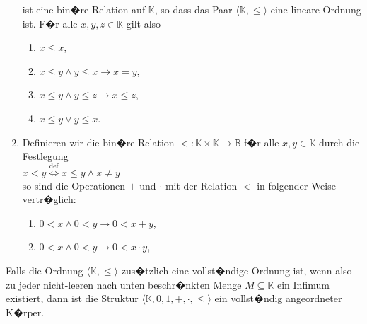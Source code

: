 \begin{Definition}
\begin{enumerate}
        ist eine bin�re Relation auf $\mathbb{K}$, so dass das Paar $\langle \mathbb{K}, \leq
       \rangle$ eine lineare Ordnung ist.  F�r alle
        $x,y,z \in \mathbb{K}$ gilt also
        \begin{enumerate}
        \item $x \leq x$,
        \item $x \leq y \wedge y \leq x \rightarrow x = y$,
        \item $x \leq y \wedge y \leq z \rightarrow x \leq z$,
        \item $x \leq y \vee y \leq x$.
        \end{enumerate}
  \item Definieren wir die bin�re Relation $<: \mathbb{K} \times \mathbb{K} \rightarrow \mathbb{B}$
        f�r alle $x,y \in \mathbb{K}$ durch die Festlegung
        \\[0.2cm]
        \hspace*{1.3cm}
        $x < y \stackrel{\mathrm{def}}{\Longleftrightarrow} x \leq y \wedge x \not= y$
        \\[0.2cm]
        so sind die Operationen $+$ und $\cdot$ mit der Relation $<$ in folgender Weise vertr�glich:
        \begin{enumerate}
        \item $0 < x \wedge 0 < y \rightarrow 0 < x + y$,
        \item $0 < x \wedge 0 < y \rightarrow 0 < x \cdot y$,
        \end{enumerate}
\end{enumerate}
Falls die Ordnung $\langle \mathbb{K}, \leq \rangle$ zus�tzlich eine vollst�ndige Ordnung ist, wenn
also zu jeder nicht-leeren nach unten beschr�nkten Menge $M \subseteq \mathbb{K}$ ein Infimum
existiert, dann ist die Struktur  $\langle \mathbb{K}, 0, 1, +, \cdot, \leq \rangle$ ein vollst�ndig
angeordneter K�rper.  \eod
\end{Definition}


